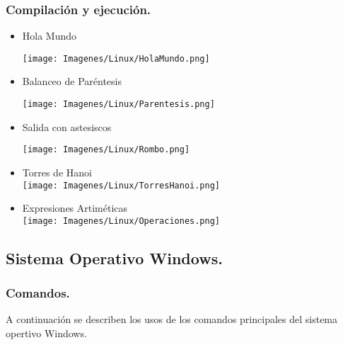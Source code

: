 \documentclass[12pt]{article}
\begin{document}
\subsubsection{ Compilación y ejecución.}
      \begin{itemize}
                \item Hola Mundo
                
                   \texttt{[image: Imagenes/Linux/HolaMundo.png]}
            
                \item Balanceo de Paréntesis
                
                  \texttt{[image: Imagenes/Linux/Parentesis.png]}
                    
                \item Salida con astesiscos
                
                    \texttt{[image: Imagenes/Linux/Rombo.png]}
                    
                \item Torres de Hanoi\\
                    \texttt{[image: Imagenes/Linux/TorresHanoi.png]}
                    \\
                \item Expresiones Artiméticas\\
                    \texttt{[image: Imagenes/Linux/Operaciones.png]}
                    
            \end{itemize}
            
\newpage
\subsection{Sistema Operativo Windows.}
\subsubsection{Comandos.}
    A continuación se describen los usos de los comandos principales del sistema opertivo Windows.
    
\end{document}
